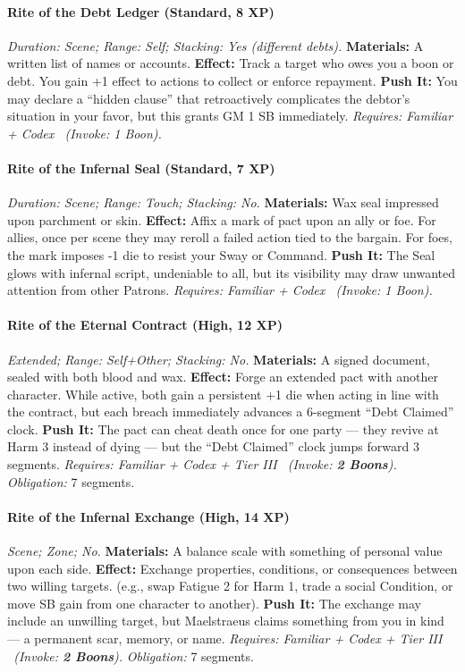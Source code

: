 \paragraph{Rite of the Debt Ledger (Standard, 8 XP)}  
\emph{Duration: Scene; Range: Self; Stacking: Yes (different debts).}  
\textbf{Materials:} A written list of names or accounts.  
\textbf{Effect:} Track a target who owes you a boon or debt. You gain +1 effect to actions to collect or enforce repayment.  
\textbf{Push It:} You may declare a “hidden clause” that retroactively complicates the debtor’s situation in your favor, but this grants GM 1 SB immediately.  
\emph{Requires: Familiar + Codex \ (\textit{Invoke:} 1 Boon).}  

\paragraph{Rite of the Infernal Seal (Standard, 7 XP)}  
\emph{Duration: Scene; Range: Touch; Stacking: No.}  
\textbf{Materials:} Wax seal impressed upon parchment or skin.  
\textbf{Effect:} Affix a mark of pact upon an ally or foe. For allies, once per scene they may reroll a failed action tied to the bargain. For foes, the mark imposes -1 die to resist your Sway or Command.  
\textbf{Push It:} The Seal glows with infernal script, undeniable to all, but its visibility may draw unwanted attention from other Patrons.  
\emph{Requires: Familiar + Codex \ (\textit{Invoke:} 1 Boon).}  

\paragraph{Rite of the Eternal Contract (High, 12 XP)}  
\emph{Extended; Range: Self+Other; Stacking: No.}  
\textbf{Materials:} A signed document, sealed with both blood and wax.  
\textbf{Effect:} Forge an extended pact with another character. While active, both gain a persistent +1 die when acting in line with the contract, but each breach immediately advances a 6-segment “Debt Claimed” clock.  
\textbf{Push It:} The pact can cheat death once for one party — they revive at Harm 3 instead of dying — but the “Debt Claimed” clock jumps forward 3 segments.  
\emph{Requires: Familiar + Codex + Tier III \ (\textit{Invoke:} \textbf{2 Boons}).}  
\emph{Obligation:} 7 segments.  

\paragraph{Rite of the Infernal Exchange (High, 14 XP)}  
\emph{Scene; Zone; No.}  
\textbf{Materials:} A balance scale with something of personal value upon each side.  
\textbf{Effect:} Exchange properties, conditions, or consequences between two willing targets. (e.g., swap Fatigue 2 for Harm 1, trade a social Condition, or move SB gain from one character to another).  
\textbf{Push It:} The exchange may include an unwilling target, but Maelstraeus claims something from you in kind — a permanent scar, memory, or name.  
\emph{Requires: Familiar + Codex + Tier III \ (\textit{Invoke:} \textbf{2 Boons}).}  
\emph{Obligation:} 7 segments.  

